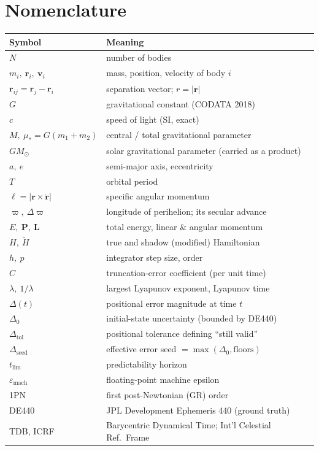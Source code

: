 \documentclass[11pt]{article}
\theoremstyle{definition}
\begin{document}
\section*{Nomenclature}
\label{sec:nomenclature}
\begin{longtable}{ll}
\toprule
Symbol & Meaning \\
\midrule
\endhead
$N$ & number of bodies \\
$m_i,\ \mathbf r_i,\ \mathbf v_i$ & mass, position, velocity of body $i$ \\
$\mathbf r_{ij} = \mathbf r_j - \mathbf r_i$ & separation vector; $r=|\mathbf r|$ \\
$G$ & gravitational constant (CODATA 2018) \\
$c$ & speed of light (SI, exact) \\
$M,\ \mu_{\!*}=G(m_1+m_2)$ & central / total gravitational parameter \\
$GM_\odot$ & solar gravitational parameter (carried as a product) \\
$a,\ e$ & semi-major axis, eccentricity \\
$T$ & orbital period \\
$\ell = |\mathbf r\times\dot{\mathbf r}|$ & specific angular momentum \\
$\varpi,\ \Delta\varpi$ & longitude of perihelion; its secular advance \\
$E,\ \mathbf P,\ \mathbf L$ & total energy, linear \& angular momentum \\
$H,\ \tilde H$ & true and shadow (modified) Hamiltonian \\
$h,\ p$ & integrator step size, order \\
$C$ & truncation-error coefficient (per unit time) \\
$\lambda,\ 1/\lambda$ & largest Lyapunov exponent, Lyapunov time \\
$\Delta(t)$ & positional error magnitude at time $t$ \\
$\Delta_0$ & initial-state uncertainty (bounded by DE440) \\
$\Delta_{\mathrm{tol}}$ & positional tolerance defining ``still valid'' \\
$\Delta_{\mathrm{seed}}$ & effective error seed $=\max(\Delta_0,\text{floors})$ \\
$t_{\mathrm{lim}}$ & predictability horizon \\
$\varepsilon_{\mathrm{mach}}$ & floating-point machine epsilon \\
1PN & first post-Newtonian (GR) order \\
DE440 & JPL Development Ephemeris 440 (ground truth) \\
TDB, ICRF & Barycentric Dynamical Time; Int'l Celestial Ref.\ Frame \\
\bottomrule
\end{longtable}
\end{document}

